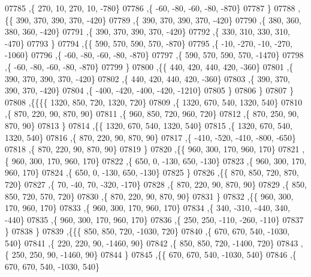 \begin{DoxyCode}
07785     ,\{   270,    10,   270,    10,  -780\}
07786     ,\{   -60,   -80,   -60,   -80,  -870\}
07787     \}
07788    ,\{\{   390,   370,   390,   370,  -420\}
07789     ,\{   390,   370,   390,   370,  -420\}
07790     ,\{   380,   360,   380,   360,  -420\}
07791     ,\{   390,   370,   390,   370,  -420\}
07792     ,\{   330,   310,   330,   310,  -470\}
07793     \}
07794    ,\{\{   590,   570,   590,   570,  -870\}
07795     ,\{   -10,  -270,   -10,  -270, -1060\}
07796     ,\{   -60,   -80,   -60,   -80,  -870\}
07797     ,\{   590,   570,   590,   570, -1470\}
07798     ,\{   -60,   -80,   -60,   -80,  -870\}
07799     \}
07800    ,\{\{   440,   420,   440,   420,  -360\}
07801     ,\{   390,   370,   390,   370,  -420\}
07802     ,\{   440,   420,   440,   420,  -360\}
07803     ,\{   390,   370,   390,   370,  -420\}
07804     ,\{  -400,  -420,  -400,  -420, -1210\}
07805     \}
07806    \}
07807   \}
07808  ,\{\{\{\{  1320,   850,   720,  1320,   720\}
07809     ,\{  1320,   670,   540,  1320,   540\}
07810     ,\{   870,   220,    90,   870,    90\}
07811     ,\{   960,   850,   720,   960,   720\}
07812     ,\{   870,   250,    90,   870,    90\}
07813     \}
07814    ,\{\{  1320,   670,   540,  1320,   540\}
07815     ,\{  1320,   670,   540,  1320,   540\}
07816     ,\{   870,   220,    90,   870,    90\}
07817     ,\{  -410,  -520,  -410,  -800,  -650\}
07818     ,\{   870,   220,    90,   870,    90\}
07819     \}
07820    ,\{\{   960,   300,   170,   960,   170\}
07821     ,\{   960,   300,   170,   960,   170\}
07822     ,\{   650,     0,  -130,   650,  -130\}
07823     ,\{   960,   300,   170,   960,   170\}
07824     ,\{   650,     0,  -130,   650,  -130\}
07825     \}
07826    ,\{\{   870,   850,   720,   870,   720\}
07827     ,\{    70,   -40,    70,  -320,  -170\}
07828     ,\{   870,   220,    90,   870,    90\}
07829     ,\{   850,   850,   720,   570,   720\}
07830     ,\{   870,   220,    90,   870,    90\}
07831     \}
07832    ,\{\{   960,   300,   170,   960,   170\}
07833     ,\{   960,   300,   170,   960,   170\}
07834     ,\{   340,  -310,  -440,   340,  -440\}
07835     ,\{   960,   300,   170,   960,   170\}
07836     ,\{   250,   250,  -110,  -260,  -110\}
07837     \}
07838    \}
07839   ,\{\{\{   850,   850,   720, -1030,   720\}
07840     ,\{   670,   670,   540, -1030,   540\}
07841     ,\{   220,   220,    90, -1460,    90\}
07842     ,\{   850,   850,   720, -1400,   720\}
07843     ,\{   250,   250,    90, -1460,    90\}
07844     \}
07845    ,\{\{   670,   670,   540, -1030,   540\}
07846     ,\{   670,   670,   540, -1030,   540\}

\end{DoxyCode}
